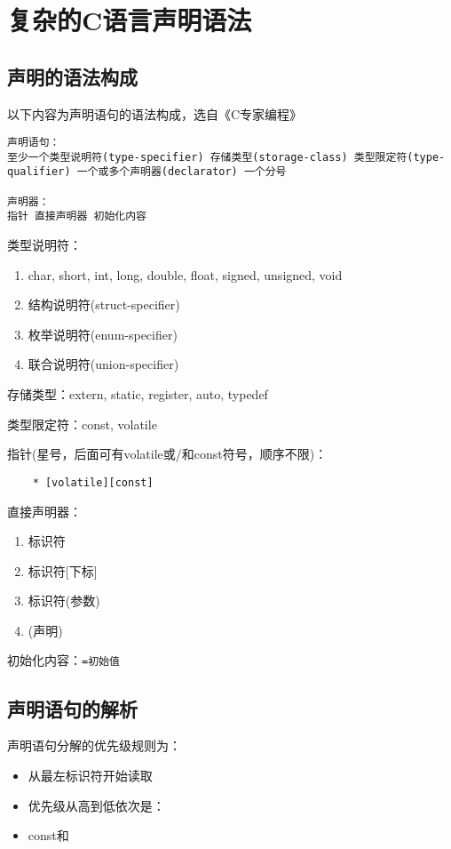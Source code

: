 \section{复杂的C语言声明语法}

\subsection{声明的语法构成}
以下内容为声明语句的语法构成，选自《C专家编程》
\begin{lstlisting}
声明语句：
至少一个类型说明符(type-specifier) 存储类型(storage-class) 类型限定符(type-qualifier) 一个或多个声明器(declarator) 一个分号

声明器：
指针 直接声明器 初始化内容

\end{lstlisting}

类型说明符：
\begin{enumerate}
    \item char, short, int, long, double, float, signed, unsigned, void 
    \item 结构说明符(struct-specifier)
    \item 枚举说明符(enum-specifier)
    \item 联合说明符(union-specifier)
\end{enumerate}

存储类型：extern, static, register, auto, typedef

类型限定符：const, volatile

指针(星号，后面可有volatile或/和const符号，顺序不限)：
\begin{lstlisting}
    * [volatile][const]
\end{lstlisting}

直接声明器：
\begin{enumerate}
    \item 标识符
    \item 标识符[下标]
    \item 标识符(参数)
    \item (声明)
\end{enumerate}

初始化内容：\verb|=初始值|

\subsection{声明语句的解析}
声明语句分解的优先级规则为：
\begin{itemize}
    \item 从最左标识符开始读取
    \item 优先级从高到低依次是： 
    \item const和 
\end{itemize}

















